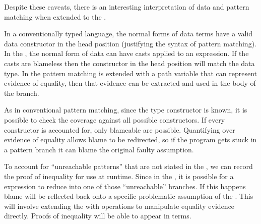 Despite these caveats, there is an interesting interpretation of data and pattern matching when extended to the \csys{}.

In a conventionally typed language, the normal forms of data terms have a valid data constructor in the head position (justifying the syntax of pattern matching).
In the \clang{}, the normal form of data can have casts applied to an expression.
If the casts are blameless then the constructor in the head position will match the data type.
In the \clang{} pattern matching is extended with a path variable that can represent evidence of equality, then that evidence can be extracted and used in the body of the branch.

As in conventional pattern matching, since the type constructor is known, it is possible to check the coverage against all possible constructors.
If every constructor is accounted for, only blameable \scruts{} are possible.
Quantifying over evidence of equality allows blame to be redirected, so if the program gets stuck in a pattern branch it can blame the original faulty assumption.

To account for ``unreachable patterns'' that are not stated in the \slang, we can record the proof of inequality for use at runtime.
Since in the \clang{}, it is possible for a \case{} expression to reduce into one of those ``unreachable'' branches.
If this happens blame will be reflected back onto a specific problematic assumption of the \scrut{}.
This will involve extending the \clang{} with operations to manipulate equality evidence directly.
Proofs of inequality will be able to appear in terms.
 









% 



